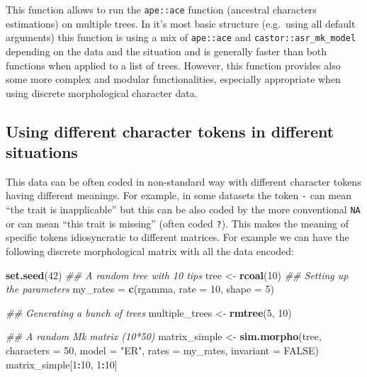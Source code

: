 \documentclass[
]{book}
\newenvironment{Shaded}{\begin{snugshade}}{\end{snugshade}}
\newcommand{\CommentTok}[1]{\textcolor[rgb]{0.56,0.35,0.01}{\textit{#1}}}
\newcommand{\DataTypeTok}[1]{\textcolor[rgb]{0.13,0.29,0.53}{#1}}
\newcommand{\DecValTok}[1]{\textcolor[rgb]{0.00,0.00,0.81}{#1}}
\newcommand{\KeywordTok}[1]{\textcolor[rgb]{0.13,0.29,0.53}{\textbf{#1}}}
\newcommand{\NormalTok}[1]{#1}
\newcommand{\OperatorTok}[1]{\textcolor[rgb]{0.81,0.36,0.00}{\textbf{#1}}}
\newcommand{\OtherTok}[1]{\textcolor[rgb]{0.56,0.35,0.01}{#1}}
\newcommand{\StringTok}[1]{\textcolor[rgb]{0.31,0.60,0.02}{#1}}
\begin{document}
This function allows to run the \texttt{ape::ace} function (ancestral characters estimations) on multiple trees.
In it's most basic structure (e.g.~using all default arguments) this function is using a mix of \texttt{ape::ace} and \texttt{castor::asr\_mk\_model} depending on the data and the situation and is generally faster than both functions when applied to a list of trees.
However, this function provides also some more complex and modular functionalities, especially appropriate when using discrete morphological character data.

\hypertarget{using-different-character-tokens-in-different-situations}{%
\subsection{Using different character tokens in different situations}\label{using-different-character-tokens-in-different-situations}}

This data can be often coded in non-standard way with different character tokens having different meanings.
For example, in some datasets the token \texttt{-} can mean ``the trait is inapplicable'' but this can be also coded by the more conventional \texttt{NA} or can mean ``this trait is missing'' (often coded \texttt{?}).
This makes the meaning of specific tokens idiosyncratic to different matrices.
For example we can have the following discrete morphological matrix with all the data encoded:

\begin{Shaded}
\begin{Highlighting}[]
\KeywordTok{set.seed}\NormalTok{(}\DecValTok{42}\NormalTok{)}
\CommentTok{\#\# A random tree with 10 tips}
\NormalTok{tree \textless{}{-}}\StringTok{ }\KeywordTok{rcoal}\NormalTok{(}\DecValTok{10}\NormalTok{)}
\CommentTok{\#\# Setting up the parameters}
\NormalTok{my\_rates =}\StringTok{ }\KeywordTok{c}\NormalTok{(rgamma, }\DataTypeTok{rate =} \DecValTok{10}\NormalTok{, }\DataTypeTok{shape =} \DecValTok{5}\NormalTok{)}

\CommentTok{\#\# Generating a bunch of trees}
\NormalTok{multiple\_trees \textless{}{-}}\StringTok{ }\KeywordTok{rmtree}\NormalTok{(}\DecValTok{5}\NormalTok{, }\DecValTok{10}\NormalTok{)}

\CommentTok{\#\# A random Mk matrix (10*50)}
\NormalTok{matrix\_simple \textless{}{-}}\StringTok{ }\KeywordTok{sim.morpho}\NormalTok{(tree, }\DataTypeTok{characters =} \DecValTok{50}\NormalTok{, }\DataTypeTok{model =} \StringTok{"ER"}\NormalTok{, }\DataTypeTok{rates =}\NormalTok{ my\_rates,}
                            \DataTypeTok{invariant =} \OtherTok{FALSE}\NormalTok{)}
\NormalTok{matrix\_simple[}\DecValTok{1}\OperatorTok{:}\DecValTok{10}\NormalTok{, }\DecValTok{1}\OperatorTok{:}\DecValTok{10}\NormalTok{]}
\end{Highlighting}
\end{Shaded}
\end{document}
